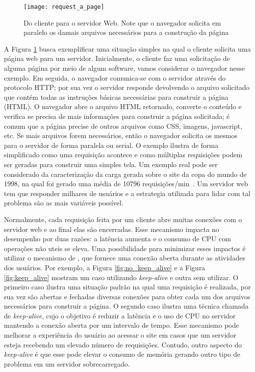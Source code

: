 \begin{figure}[!h]
  \centering
  \texttt{[image: request\_a\_page]}
  \caption[Do cliente para o servidor Web.]{Do cliente para o servidor Web. Note que o navegador solicita em paralelo os damais arquivos necessários para a construção da página}
  \label{fig:client_to_web_server}
\end{figure}

A Figura \ref{fig:client_to_web_server} busca exemplificar uma situação simples
na qual o cliente solicita uma página web para um servidor. Inicialmente, o
cliente faz uma solicitação de alguma página por meio de algum software, vamos
considerar o navegador nesse exemplo. Em seguida, o navegador comunica-se com o
servidor através do protocolo HTTP; por sua vez o servidor responde devolvendo
o arquivo solicitado que contém todas as instruções básicas necessárias para
construir a página (HTML). O navegador abre o arquivo HTML retornado, converte
o conteúdo e verifica se precisa de mais informações para construir a página
solicitada; é comum que a página precise de outros arquivos como CSS, imagens,
javascript, etc. Se mais arquivos forem necessários, então o navegador solicita
os mesmos para o servidor de forma paralela ou serial. O exemplo ilustra de
forma simplificado como uma requisição acontece e como múltiplas requisições
podem ser geradas para construir uma simples tela. Um exemplo real pode ser
considerado da caracterização da carga gerada sobre o site da copa do mundo de
1998, na qual foi gerado uma média de 10796 requisições/min~\citep{worldcup}.
Um servidor web tem que responder milhares de usuários e a estrategia utilizada
para lidar com tal problema são as mais variáveis possível.

Normalmente, cada requisição feita por um cliente abre muitas conexões com o
servidor web e ao final elas são encerradas. Esse mecanismo impacta no
desempenho por duas razões: a latência aumenta e o consumo de CPU com operações
não uteis se eleva. Uma possibilidade para minimizar esses impactos é utilizar
o mecanismo de , que fornece uma conexão
aberta durante as atividades dos usuários. Por exemplo, a Figura
\ref{fig:no_keep_alive} e a Figura \ref{fig:keep_alive} mostram um caso
utilizando \textit{keep-alive} e outra sem utilizar. O primeiro caso ilustra
uma situação padrão na qual uma requisição é realizada, por sua vez são abertas
e fechadas diversas conexões para obter cada um dos arquivos necessários para
construir a página. O segundo caso ilustra uma técnica chamada de
\textit{keep-alive}, cujo o objetivo é reduzir a latência e o uso de CPU no
servidor mantendo a conexão aberta por um intervalo de tempo.  Esse mecanismo
pode melhorar a experiência do usuário ao acessar o site em casos que um
servidor esteja recebendo um elevado número de requisições. Contudo, outro
aspecto do \textit{keep-alive} é que esse pode elevar o consumo de memória
gerando outro tipo de problema em um servidor sobrecarregado.

